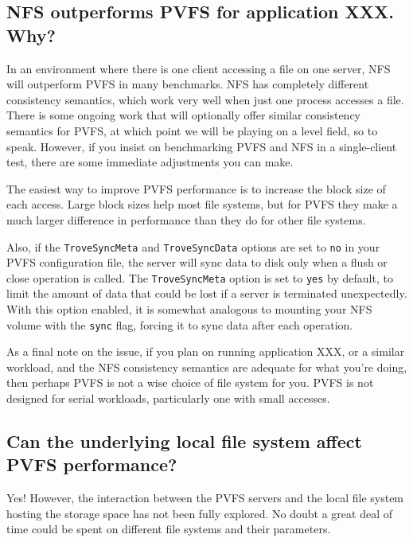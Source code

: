 \documentclass[11pt,letterpaper]{article}
\begin{document}
\subsection{NFS outperforms PVFS for application XXX. Why?}
\label{sec:nfs_vs_pvfs2}

In an environment where there is one client accessing a file on one
server, NFS will outperform PVFS in many benchmarks.  NFS has
completely different consistency semantics, which work very well when
just one process accesses a file.  There is some ongoing work that
will optionally offer similar consistency semantics for PVFS, at
which point we will be playing on a level field, so to speak.
However, if you insist on benchmarking PVFS and NFS in a
single-client test, there are some immediate adjustments you can make.

The easiest way to improve PVFS performance is to increase the block
size of each access.  Large block sizes help most file systems, but
for PVFS they make a much larger difference in performance than they
do for other file systems.

Also, if the \texttt{TroveSyncMeta} and \texttt{TroveSyncData} options
are set to \texttt{no} in your PVFS configuration file, the server
will sync data to disk only when a flush or close operation is called.
The \texttt{TroveSyncMeta} option is set to \texttt{yes} by default, 
to limit the amount of
data that could be lost if a server is terminated unexpectedly.  With
this option enabled, it is somewhat analogous to mounting your NFS
volume with the \texttt{sync} flag, forcing it to sync data after each
operation.

As a final note on the issue, if you plan on running application XXX,
or a similar workload, and the NFS consistency semantics are adequate
for what you're doing, then perhaps PVFS is not a wise choice of file
system for you.  PVFS is not designed for serial workloads,
particularly one with small accesses.

\subsection{Can the underlying local file system affect PVFS performance?}
\label{sec:local_fs}

Yes!  However, the interaction between the PVFS servers and the local
file system hosting the storage space has not been fully explored.  No
doubt a great deal of time could be spent on different file systems
and their parameters.
\end{document}
